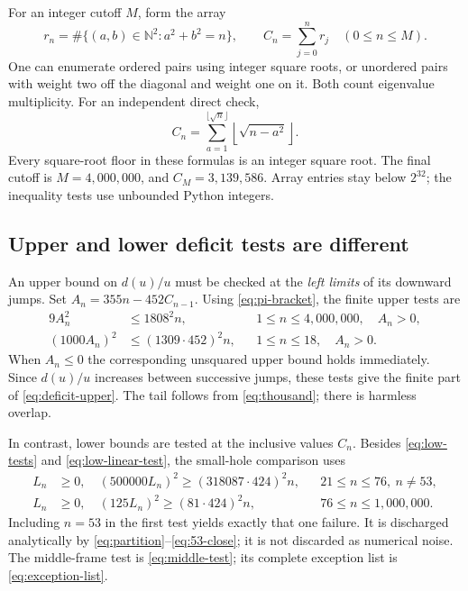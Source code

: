 \documentclass[11pt,reqno]{amsart}
\numberwithin{equation}{section}
\newcommand{\N}{\mathbb N}
\begin{document}
For an integer cutoff $M$, form the array
\begin{equation}\label{eq:count-array}
 r_n=\#\{(a,b)\in\N^2:a^2+b^2=n\},\qquad
 C_n=\sum_{j=0}^n r_j\quad(0\le n\le M).
\end{equation}
One can enumerate ordered pairs using integer square roots,
or unordered pairs with weight two off the diagonal and
weight one on it. Both count eigenvalue multiplicity.
For an independent direct check,
\begin{equation}\label{eq:count-row}
 C_n=\sum_{a=1}^{\lfloor\sqrt n\rfloor}
                         \left\lfloor\sqrt{n-a^2}\right\rfloor.
\end{equation}
Every square-root floor in these formulas is an integer
square root. The final cutoff is $M=4{,}000{,}000$, and
$C_M=3{,}139{,}586$. Array entries stay below $2^{32}$;
the inequality tests use unbounded Python integers.

\subsection*{Upper and lower deficit tests are different}

An upper bound on $d(u)/u$ must be checked at the
\emph{left limits} of its downward jumps. Set
$A_n=355n-452C_{n-1}$. Using \eqref{eq:pi-bracket}, the
finite upper tests are
\begin{align}
 9A_n^2&\le1808^2 n,
 &&1\le n\le4{,}000{,}000,\quad A_n>0,
 \label{eq:cert-upper}\\
 (1000A_n)^2&\le(1309\cdot452)^2n,
 &&1\le n\le18,\quad A_n>0.
 \label{eq:cert-prefix}
\end{align}
When $A_n\le0$ the corresponding unsquared upper bound
holds immediately. Since $d(u)/u$ increases between
successive jumps, these tests give the finite part of
\eqref{eq:deficit-upper}. The tail follows from
\eqref{eq:thousand}; there is harmless overlap.

In contrast, lower bounds are tested at the inclusive
values $C_n$. Besides \eqref{eq:low-tests} and
\eqref{eq:low-linear-test}, the small-hole comparison uses
\begin{align}
 L_n&\ge0,\quad
 (500000L_n)^2\ge(318087\cdot424)^2n,
 &&21\le n\le76,\ n\ne53,
 \label{eq:cert-hole-middle}\\
 L_n&\ge0,\quad
 (125L_n)^2\ge(81\cdot424)^2n,
 &&76\le n\le1{,}000{,}000.
 \label{eq:cert-hole-high}
\end{align}
Including $n=53$ in the first test yields exactly that
one failure. It is discharged analytically by
\eqref{eq:partition}--\eqref{eq:53-close}; it is not
discarded as numerical noise. The middle-frame test is
\eqref{eq:middle-test}; its complete exception list is
\eqref{eq:exception-list}.
\end{document}
